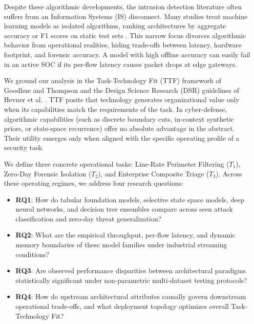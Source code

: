 \documentclass[10pt,a4paper]{article}
\begin{document}
Despite these algorithmic developments, the intrusion detection literature often suffers from an Information Systems (IS) disconnect. Many studies treat machine learning models as isolated algorithms, ranking architectures by aggregate accuracy or F1 scores on static test sets \cite{sarhan2022towards, kutiel2024feasibility}. This narrow focus divorces algorithmic behavior from operational realities, hiding trade-offs between latency, hardware footprint, and forensic accuracy. A model with high offline accuracy can easily fail in an active SOC if its per-flow latency causes packet drops at edge gateways.

We ground our analysis in the Task-Technology Fit (TTF) framework of Goodhue and Thompson \cite{goodhue1995task} and the Design Science Research (DSR) guidelines of Hevner et al. \cite{hevner2004design}. TTF posits that technology generates organizational value only when its capabilities match the requirements of the task. In cyber-defense, algorithmic capabilities (such as discrete boundary cuts, in-context synthetic priors, or state-space recurrence) offer no absolute advantage in the abstract. Their utility emerges only when aligned with the specific operating profile of a security task.

We define three concrete operational tasks: Line-Rate Perimeter Filtering ($T_1$), Zero-Day Forensic Isolation ($T_2$), and Enterprise Composite Triage ($T_3$). Across these operating regimes, we address four research questions:
\begin{itemize}
    \item \textbf{RQ1}: How do tabular foundation models, selective state space models, deep neural networks, and decision tree ensembles compare across seen attack classification and zero-day threat generalization?
    \item \textbf{RQ2}: What are the empirical throughput, per-flow latency, and dynamic memory boundaries of these model families under industrial streaming conditions?
    \item \textbf{RQ3}: Are observed performance disparities between architectural paradigms statistically significant under non-parametric multi-dataset testing protocols?
    \item \textbf{RQ4}: How do upstream architectural attributes causally govern downstream operational trade-offs, and what deployment topology optimizes overall Task-Technology Fit?
\end{itemize}
\end{document}
